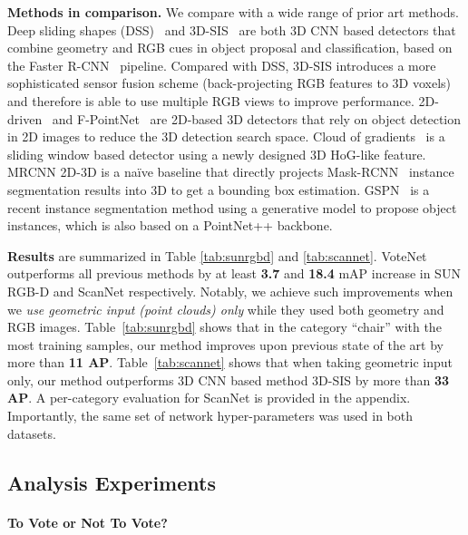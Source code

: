 \documentclass[10pt,twocolumn,letterpaper]{article}
\newcommand\votenet{VoteNet}
\begin{document}
\smallskip
\noindent\textbf{Methods in comparison.} We compare with a wide range of prior art methods. Deep sliding shapes (DSS)~\cite{song2016deep} and 3D-SIS~\cite{hou20183d} are both 3D CNN based detectors that combine geometry and RGB cues in object proposal and classification, based on the Faster R-CNN~\cite{ren2015faster} pipeline. Compared with DSS, 3D-SIS introduces a more sophisticated sensor fusion scheme (back-projecting RGB features to 3D voxels) and therefore is able to use multiple RGB views to improve performance. 2D-driven~\cite{lahoud20172d} and F-PointNet~\cite{qi2018frustum} are 2D-based 3D detectors that rely on object detection in 2D images to reduce the 3D detection search space. Cloud of gradients~\cite{ren2016three} is a sliding window based detector using a newly designed 3D HoG-like feature. MRCNN 2D-3D is a na\"ive baseline that directly projects Mask-RCNN~\cite{he2017mask} instance segmentation results into 3D to get a bounding box estimation. GSPN~\cite{yi2018gspn} is a recent instance segmentation method using a generative model to propose object instances, which is also based on a PointNet++ backbone.

\smallskip
\noindent\textbf{Results}
are summarized in Table \ref{tab:sunrgbd} and \ref{tab:scannet}. \votenet{} outperforms all previous methods by at least \textbf{3.7} and \textbf{18.4} mAP increase in SUN RGB-D and ScanNet respectively. Notably, we achieve such improvements when we \emph{use geometric input (point clouds) only} while they used both geometry and RGB images. Table~\ref{tab:sunrgbd} shows that in the category ``chair'' with the most training samples, our method improves upon previous state of the art by more than \textbf{11 AP}.
Table~\ref{tab:scannet} shows that when taking geometric input only, our method outperforms 3D CNN based method 3D-SIS by more than \textbf{33 AP}.
A per-category evaluation for ScanNet is provided in the appendix. Importantly, the same set of network hyper-parameters was used in both datasets. 





\subsection{Analysis Experiments}
\label{sec:exp:analysis}



\paragraph{To Vote or Not To Vote?}
\end{document}
